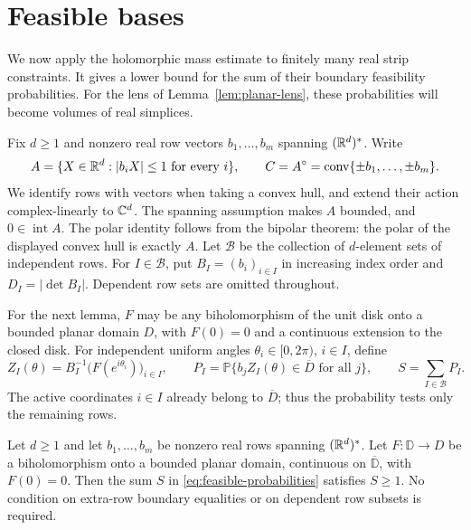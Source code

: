 \section{Feasible bases}\label{sec:feasibility}

We now apply the holomorphic mass estimate to finitely many real strip
constraints. It gives a lower bound for the sum of their boundary
feasibility probabilities. For the lens of Lemma~\ref{lem:planar-lens},
these probabilities will become volumes of real simplices.

Fix $d\geq1$ and nonzero real row vectors $b_1,\ldots,b_m$ spanning
$(\mathbb R^d)^*$. Write
\begin{equation}\label{eq:strip-body}
 A=\{X\in\mathbb R^d:|b_iX|\leq1\text{ for every }i\},
 \qquad C=A^\circ=\operatorname{conv}\{\pm b_1,\ldots,\pm b_m\}.
\end{equation}
We identify rows with vectors when taking a convex hull, and extend their
action complex-linearly to $\mathbb C^d$. The spanning assumption makes $A$
bounded, and $0\in\operatorname{int}A$. The polar identity follows from
the bipolar theorem: the polar of the displayed convex hull is exactly
$A$.
Let $\mathcal B$ be the collection of $d$-element sets of independent rows.
For $I\in\mathcal B$, put $B_I=(b_i)_{i\in I}$ in increasing index order
and $D_I=|\det B_I|$. Dependent row sets are omitted throughout.

For the next lemma, $F$ may be any biholomorphism of the unit disk onto a
bounded planar domain $D$, with $F(0)=0$ and a continuous extension to the
closed disk. For independent uniform angles $\theta_i\in[0,2\pi)$,
$i\in I$, define
\begin{equation}\label{eq:feasible-probabilities}
 Z_I(\theta)=B_I^{-1}\bigl(F(e^{i\theta_i})\bigr)_{i\in I},
 \qquad
 P_I=\mathbb P\{b_jZ_I(\theta)\in\overline D\text{ for all }j\},
 \qquad S=\sum_{I\in\mathcal B}P_I.
\end{equation}
The active coordinates $i\in I$ already belong to $\overline D$; thus the
probability tests only the remaining rows.

\begin{lemma}\label{lem:holomorphic-feasibility}
Let $d\ge1$ and let $b_1,\ldots,b_m$ be nonzero real rows spanning
$(\mathbb R^d)^*$. Let $F:\mathbb D\to D$ be a biholomorphism onto a bounded
planar domain, continuous on $\overline{\mathbb D}$, with $F(0)=0$.
Then the sum $S$ in \eqref{eq:feasible-probabilities} satisfies $S\ge1$.
No condition on extra-row boundary equalities or on dependent row
subsets is required.
\end{lemma}

